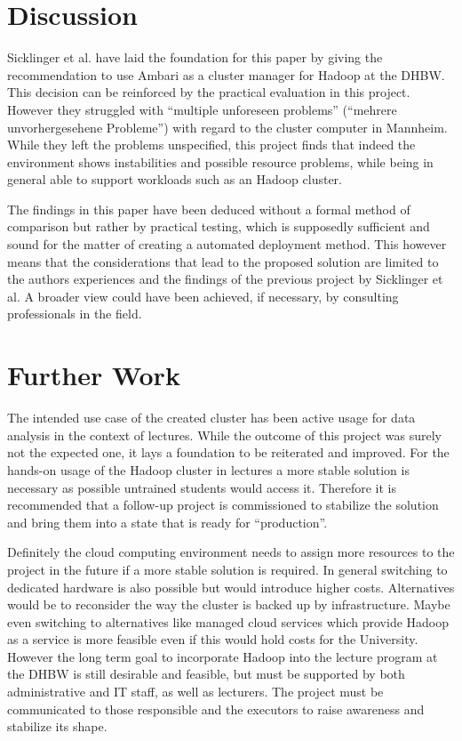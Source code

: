 \section{Discussion}

Sicklinger et al. have laid the foundation for this paper by giving the 
recommendation to use Ambari as a cluster manager for Hadoop at the \ac{DHBW}.
This decision can be reinforced by the practical evaluation in this project.
However they struggled with \enquote{multiple unforeseen problems} (\enquote{mehrere unvorhergesehene
Probleme}) \autocite[][p. 53]{wi2018managementsystems} with regard to the cluster computer in Mannheim.
While they left the problems unspecified, this project finds that indeed the environment shows instabilities and possible resource problems, while being in general able to support workloads such as an Hadoop cluster.

The findings in this paper have been deduced without a formal method of comparison but rather by practical testing, which is supposedly sufficient and sound for the matter of creating a automated deployment method.
This however means that the considerations that lead to the proposed solution are limited 
to the authors experiences and the findings of the previous project by Sicklinger et al.
A broader view could have been achieved, if necessary, by consulting professionals in the field.

\section{Further Work}

The intended use case of the created cluster has been active usage for data analysis in the context of lectures.
While the outcome of this project was surely not the expected one, 
it lays a foundation to be reiterated and improved.
For the hands-on usage of the Hadoop cluster in lectures a more stable 
solution is necessary as possible untrained students would access it.
Therefore it is recommended that a follow-up project is commissioned to stabilize the solution and bring them into a state that is ready for \enquote{production}.

Definitely the cloud computing environment needs to assign more resources to the project in the future if a more stable solution is required.
In general switching to dedicated hardware is also possible but would introduce higher costs.
Alternatives would be to reconsider the way the cluster is backed up by infrastructure.
Maybe even switching to alternatives like managed cloud services which provide Hadoop as a service is more feasible even if this would hold costs for the University.
However the long term goal to incorporate Hadoop into the lecture program at the \ac{DHBW} is still desirable and feasible, but must be supported by both administrative and \ac{IT} staff, as well as lecturers. 
The project must be communicated to those responsible and the executors to raise awareness and stabilize its shape.



